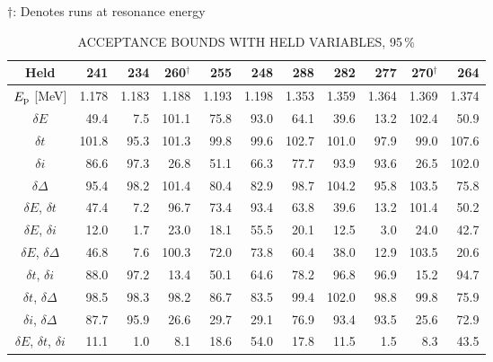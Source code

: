 \begin{table}
\begin{center}
        \vspace{0.5em}
        $\dagger$: Denotes runs at resonance energy
    \end{center}
\end{table}

\begin{table}
\small
    \begin{center}
        \label{tab:acceptance-uncertainty-95}
        \caption{ACCEPTANCE BOUNDS WITH HELD VARIABLES, 95\,\%}
        \begin{tabular}{crrrrrrrrrr}
            \toprule
            \midrule
            \textbf{Held}
                & \textbf{241} & \textbf{234} & \textbf{260}$^\dagger$ & \textbf{255} & \textbf{248}
                & \textbf{288} & \textbf{282} & \textbf{277} & \textbf{270}$^\dagger$ & \textbf{264} \\
            \midrule
$E_{\rm p}$ [MeV] & 1.178 & 1.183 & 1.188 & 1.193 & 1.198 & 1.353 & 1.359 & 1.364 & 1.369 & 1.374 \\
\midrule
$\delta E$     &  49.4 &   7.5 & 101.1 &  75.8 &  93.0 &  64.1 &  39.6 &  13.2 & 102.4 &  50.9 \\
$\delta t$     & 101.8 &  95.3 & 101.3 &  99.8 &  99.6 & 102.7 & 101.0 &  97.9 &  99.0 & 107.6 \\
$\delta i$     &  86.6 &  97.3 &  26.8 &  51.1 &  66.3 &  77.7 &  93.9 &  93.6 &  26.5 & 102.0 \\
$\delta\Delta$ &  95.4 &  98.2 & 101.4 &  80.4 &  82.9 &  98.7 & 104.2 &  95.8 & 103.5 &  75.8 \\
$\delta E$, $\delta t$     &  47.4 &   7.2 &  96.7 &  73.4 &  93.4 &  63.8 &  39.6 &  13.2 & 101.4 &  50.2 \\
$\delta E$, $\delta i$     &  12.0 &   1.7 &  23.0 &  18.1 &  55.5 &  20.1 &  12.5 &   3.0 &  24.0 &  42.7 \\
$\delta E$, $\delta\Delta$ &  46.8 &   7.6 & 100.3 &  72.0 &  73.8 &  60.4 &  38.0 &  12.9 & 103.5 &  20.6 \\
$\delta t$, $\delta i$     &  88.0 &  97.2 &  13.4 &  50.1 &  64.6 &  78.2 &  96.8 &  96.9 &  15.2 &  94.7 \\
$\delta t$, $\delta\Delta$ &  98.5 &  98.3 &  98.2 &  86.7 &  83.5 &  99.4 & 102.0 &  98.8 &  99.8 &  75.9 \\
$\delta i$, $\delta\Delta$ &  87.7 &  95.9 &  26.6 &  29.7 &  29.1 &  76.9 &  93.4 &  93.5 &  25.6 &  72.9 \\
$\delta E$, $\delta t$, $\delta i$     &  11.1 &   1.0 &   8.1 &  18.6 &  54.0 &  17.8 &  11.5 &   1.5 &   8.3 &  43.5 \\

\end{tabular}
\end{center}
\end{table}
